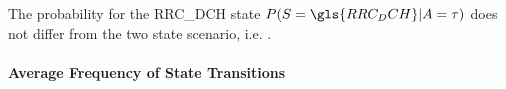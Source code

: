 The probability for the \gls{RRC_DCH} state \(P(\RRCState=\gls{RRC_DCH} \vert \PacketIAT = \ObservationIntervalLength)\) does not differ from the two state scenario, i.e. .

\paragraph*{Average Frequency of State Transitions}

\newcommand{\fStateTransitionsDCHToFACH}{f_{\gls{RRC_DCH}\rightarrow\gls{RRC_FACH}}}
\newcommand{\fStateTransitionsFACHToIdle}{f_{\gls{RRC_FACH}\rightarrow\gls{RRC_idle}}}
\newcommand{\fStateTransitionsFACHToDCH}{f_{\gls{RRC_FACH}\rightarrow\gls{RRC_DCH}}}

